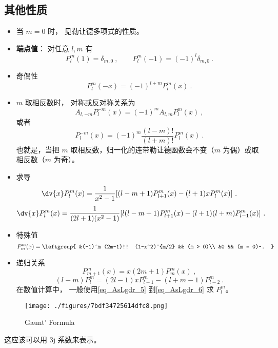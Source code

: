\subsection{其他性质}
\begin{itemize}
\item 当 $m = 0$ 时， 见勒让德多项式的性质。

\item \textbf{端点值}： 对任意 $l, m$ 有
\begin{equation}\label{eq_AsLgdr_2}
P_l^m(1) = \delta_{m, 0}~,
\qquad
P_l^m(-1) = (-1)^l \delta_{m, 0}~.
\end{equation}
\item 奇偶性
\begin{equation}
P_l^m(-x) = (-1)^{l+m}P_l^m(x)~.
\end{equation}
\item $m$ 取相反数时， 对称或反对称关系为
\begin{equation}
A_{l,-m} P_l^{-m}(x) = (-1)^m A_{l,m} P_l^m(x)~,
\end{equation}
或者
\begin{equation}
P_l^{-m}(x) = (-1)^m \frac{(l-m)!}{(l+m)!} P_l^m(x)~.
\end{equation}
也就是，当把 $m$ 取相反数，归一化的连带勒让德函数会不变（$m$ 为偶）或取相反数（$m$ 为奇）。
\item 求导
\begin{equation}\label{eq_AsLgdr_7} %
\dv{x} P_l^m(x) = \frac{1}{x^2-1} [(l-m+1)P_{l+1}^m(x) - (l+1)xP_l^m(x)]~.
\end{equation}
\begin{equation}\label{eq_AsLgdr_8} %
\dv{x} P_l^m(x) = \frac{1}{(2l+1)(x^2-1)} [l(l-m+1)P_{l+1}^m(x) - (l+1)(l+m)P_{l-1}^m(x)]~.
\end{equation}
\item 特殊值
\begin{equation}\label{eq_AsLgdr_5} %
P_m^m(x) = \leftgroup{
&(-1)^m (2m-1)!! (1-x^2)^{m/2} && (m > 0)\\
&0 && (m = 0)~.
}\end{equation}
\item 递归关系
\begin{equation} %
P_{m+1}^m(x) = x (2m + 1) P_m^m(x)~,
\end{equation}
\begin{equation}\label{eq_AsLgdr_6} %
(l-m) P_l^m = (2l-1) x P_{l-1}^m - (l+m-1) P_{l-2}^m~.
\end{equation}
在数值计算中， 一般使用\autoref{eq_AsLgdr_5} 到\autoref{eq_AsLgdr_6} 求 $P_l^m$。
\end{itemize}


\begin{figure}[ht]
\centering
\texttt{[image: ./figures/7bdf34725614dfc8.png]}
\caption{Gaunt' Formula} \label{fig_AsLgdr_1}
\end{figure}
这应该可以用 3j 系数来表示。
